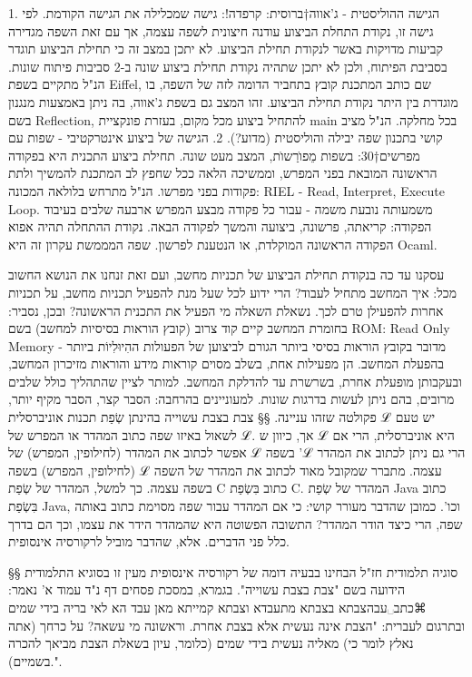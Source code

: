     1. הגישה ההוליסטית - ג'אווה†{ברוסית: קרפדה!}: גישה שמכלילה את הגישה
    הקודמת. לפי גישה זו, נקודת התחלת הביצוע עודנה חיצונית
    לשפה עצמה, אך עם זאת השפה מגדירה קביעות מדויקות באשר
    לנקודת תחילת הביצוע. לא יתכן במצב זה כי תחילת הביצוע
    תוגדר בסביבת הפיתוח, ולכן לא יתכן שתהיה נקודת תחילת
    ביצוע שונה ב-2 סביבות פיתוח שונות. הנ"ל מתקיים בשפת
    Eiffel, שם כותב המתכנת קובץ בתחביר הדומה לזה של השפה,
    בו מוגדרת בין היתר נקודת תחילת הביצוע. זהו המצב גם בשפת
    ג'אווה, בה ניתן באמצעות מנגנון בשם Reflection, להתחיל
    ביצוע מכל מקום, בעזרת פונקציית main בכל מחלקה. הנ"ל
    מציב קושי בתכנון שפה יבילה והוליסטית (מדוע?). 2. הגישה
    של ביצוע אינטרקטיבי - שפות עם מפרשים†{30}: בשפות
    מֵפוׂרַשוׂת, המצב מעט שונה. תחילת ביצוע התכנית היא בפקודה
    הראשונה המובאת בפני המפרש, וממשיכה הלאה ככל שחפץ לב
    המתכנת להמשיך ולתת פקודות בפני מפרשו. הנ"ל מתרחש בלולאה
    המכונה: RIEL - Read, Interpret, Execute Loop. משמעותה
    נובעת משמה - עבור כל פקודה מבצע המפרש ארבעה שלבים
    בעיבוד הפקודה: קריאתה, פרשונה, ביצועה והמשך לפקודה
    הבאה. נקודת ההתחלה תהיה אפוא הפקודה הראשונה המוקלדת, או
    הנטענת לפרשון. שפה המממשת עקרון זה היא Ocaml.
    
    עסקנו עד כה בנקודת תחילת הביצוע של תכניות מחשב, ועם זאת זנחנו את הנושא החשוב
    מכל: איך המחשב מתחיל לעבוד? הרי ידוע לכל שעל מנת להפעיל תכניות מחשב, על תכניות
    אחרות להפעילן טרם לכך. נשאלת השאלה מי הפעיל את התכנית הראשונה? ובכן, נסביר:
    בחומרת המחשב קיים קוד צרוב (קובץ הוראות בסיסיות למחשב) בשם ROM: Read Only
    Memory - מדובר בקובץ הוראות בסיסי ביותר הגורם לביצוען של הפעולות ההִיוּלִיוֹת
    ביותר בהפעלת המחשב. הן מפעילות אחת, בשלב מסוים קוראות מידע והוראות מזיכרון
    המחשב, ובעקבותן מופעלת אחרת, בשרשרת עד להדלקת המחשב. למותר לציין שהתהליך כולל
    שלבים מרובים, בהם ניתן לעשות בדרגות שונות. למעוניינים בהרחבה: הסבר קצר, הסבר
    מקיף יותר, פקולטה שזהו עניינה. 
    §§ צבת בצבת עשוייה 
    בהינתן שְׂפַת תכנות אוניברסלית ℒ
    יש טעם לשאול באיזו שפה כתוב המהדר או המפרש של ℒ. אך, כיוון ש ℒ היא אוניברסלית,
    הרי אם אפשר לכתוב את המהדר (לחילופין, המפרש) של ℒ בשפה 'ℒ הרי גם ניתן לכתוב את
    המהדר (לחילופין, המפרש) בשפה ℒ עצמה. מתברר שמקובל מאוד לכתוב את המהדר של השפה
    בשפה עצמה. כך למשל, המהדר של שְׂפַת C כתוב בִּשְׂפַת C. המהדר של שְׂפַת Java כתוב בִּשְׂפַת
    Java, וכו'. כמובן שהדבר מעורר קושי: כי אם המהדר עבור שפה מסוימת כתוב באותה שפה,
    הרי כיצד הודר המהדר? התשובה הפשוטה היא שהמהדר הידר את עצמו, וכך הם בדרך כלל פני
    הדברים. אלא, שהדבר מוביל לרקורסיה אינסופית. 
    
    §§ סוגיה תלמודית 
    חז"ל הבחינו בבעיה
    דומה של רקורסיה אינסופית מעין זו בסוגיא התלמודית הידועה בשם "צבת בצבת עשוייה".
    בגמרא, במסכת פסחים דף נ"ד עמוד א' נאמר: ⌘כתב␣עבה{צבתא בצבתא מתעבדא וצבתא קמייתא מאן עבד
    הא לאי בריה בידי שמים} ובתרגום לעברית: "הצבת אינה נעשית אלא בצבת אחרת. וראשונה
    מי עשאה? על כרחך (אתה נאלץ לומר כי) מאליה נעשית בידי שמים (כלומר, עיון בשאלת הצבת מביאך להכרה בשמיים).". 
    
